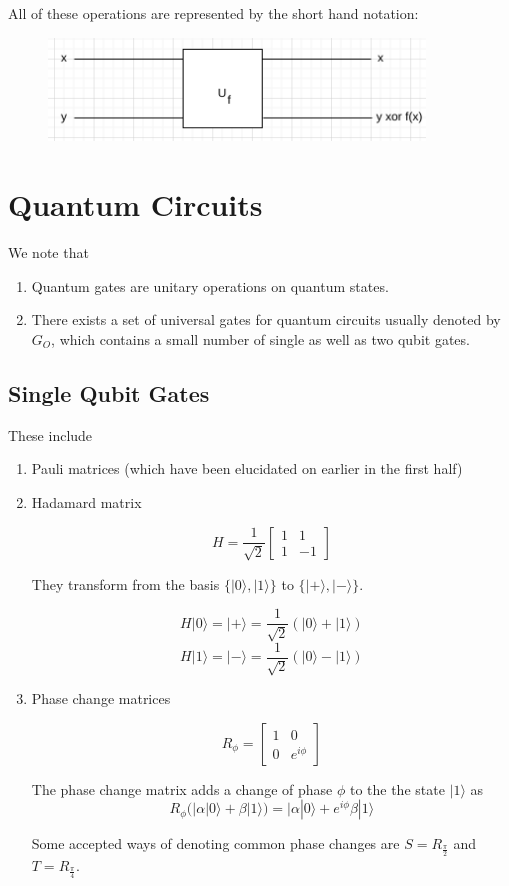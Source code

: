 \documentclass{article}
\begin{document}
All of these operations are represented by the short hand notation:

\begin{figure}[htp]
	\centering
	\includegraphics[width=10cm]{uncomputation.png}
\end{figure}

\section {Quantum Circuits}

We note that
\begin{enumerate}
	\item Quantum gates are unitary operations on quantum states.
	\item There exists a set of universal gates for quantum circuits usually denoted by $G_O$, which contains a small number of single as well as two qubit gates.
\end{enumerate}

\subsection{Single Qubit Gates}

These include

\begin{enumerate}
	\item Pauli matrices (which have been elucidated on earlier in the first half)
	\item Hadamard matrix

	      $$H = \frac{1}{\sqrt{2}} \begin{bmatrix}
			      1 & 1  \\
			      1 & -1
		      \end{bmatrix}$$

	      They transform from the basis $\{|0\rangle, |1\rangle\}$ to $\{|+\rangle, |-\rangle\}$.

	      $$H|0\rangle = |+\rangle = \frac{1}{\sqrt{2}}(|0\rangle + |1\rangle)$$
	      $$H|1\rangle = |-\rangle = \frac{1}{\sqrt{2}}(|0\rangle - |1\rangle)$$

	\item Phase change matrices

	      $$R_{\phi} = \begin{bmatrix}
			      1 & 0         \\
			      0 & e^{i\phi}
		      \end{bmatrix}$$

	      The phase change matrix adds a change of phase $\phi$ to the the state $|1\rangle$ as $$R_{\phi}(|\alpha |0\rangle + \beta |1\rangle) = |\alpha |0\rangle + e^{i\phi}\beta |1\rangle$$

	      Some accepted ways of denoting common phase changes are $S=R_{\frac{\pi}{2}}$ and $T=R_{\frac{\pi}{4}}$.

\end{enumerate}
\end{document}
